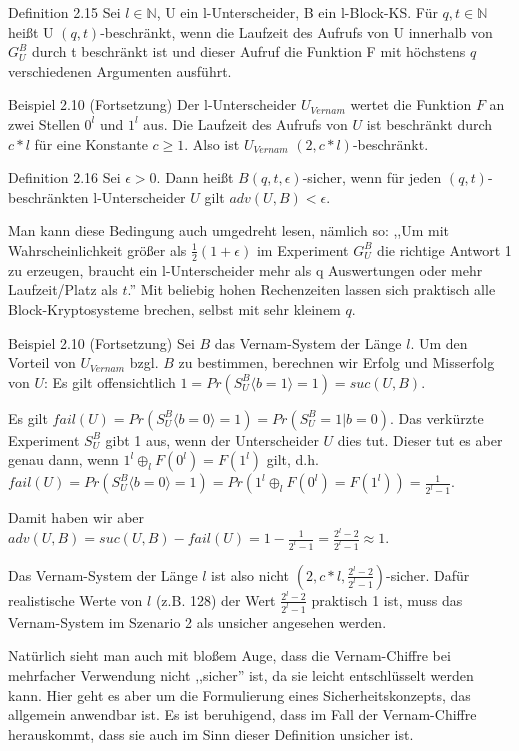 \documentclass[a4paper]{article}
\begin{document}
\begin{multicols}{3}
    Definition 2.15 Sei $l\in\mathbb{N}$, U ein l-Unterscheider, B ein l-Block-KS. Für $q,t\in\mathbb{N}$ heißt U $(q,t)$-beschränkt, wenn die Laufzeit des Aufrufs von U innerhalb von $G^B_U$ durch t beschränkt ist und dieser Aufruf die Funktion F mit höchstens $q$ verschiedenen Argumenten ausführt.

    Beispiel 2.10 (Fortsetzung) Der l-Unterscheider $U_{Vernam}$ wertet die Funktion $F$ an zwei Stellen $0^l$ und $1^l$ aus. Die Laufzeit des Aufrufs von $U$ ist beschränkt durch $c*l$ für eine Konstante $c\geq 1$. Also ist $U_{Vernam}$ $(2,c*l)$-beschränkt.

    Definition 2.16 Sei $\epsilon>0$. Dann heißt $B(q,t,\epsilon)$-sicher, wenn für jeden $(q,t)$-beschränkten l-Unterscheider $U$ gilt $adv(U,B)< \epsilon$.

    Man kann diese Bedingung auch umgedreht lesen, nämlich so: ,,Um mit Wahrscheinlichkeit größer als $\frac{1}{2}(1 +\epsilon)$ im Experiment $G^B_U$ die richtige Antwort 1 zu erzeugen, braucht ein l-Unterscheider mehr als q Auswertungen oder mehr Laufzeit/Platz als $t$.'' Mit beliebig hohen Rechenzeiten lassen sich praktisch alle Block-Kryptosysteme brechen, selbst mit sehr kleinem $q$.

    Beispiel 2.10 (Fortsetzung) Sei $B$ das Vernam-System der Länge $l$. Um den Vorteil von $U_{Vernam}$ bzgl. $B$ zu bestimmen, berechnen wir Erfolg und Misserfolg von $U$: Es gilt offensichtlich $1=Pr(S^B_U\langle b= 1\rangle = 1) = suc(U,B)$.

    Es gilt $fail(U) = Pr(S^B_U\langle b= 0\rangle = 1) = Pr(S_U^B= 1|b= 0)$. Das verkürzte Experiment $S_U^B$ gibt 1 aus, wenn der Unterscheider $U$ dies tut. Dieser tut es aber genau dann, wenn $1^l\oplus_l F(0^l) =F(1^l)$ gilt, d.h. $fail(U) = Pr(S_U^B\langle b= 0\rangle = 1) = Pr(1^l\oplus_l F(0^l) =F(1^l)) = \frac{1}{2^l- 1}$.

    Damit haben wir aber $adv(U,B) = suc(U,B)-fail(U) = 1-\frac{1}{2^l- 1}=\frac{2^l-2}{2^l-1}\approx 1$.

    Das Vernam-System der Länge $l$ ist also nicht $(2,c*l,\frac{2^l- 2}{2^l- 1})$-sicher. Dafür realistische Werte von $l$ (z.B. 128) der Wert $\frac{2^l-2}{2^l-1}$ praktisch 1 ist, muss das Vernam-System im Szenario 2 als unsicher angesehen werden.

    Natürlich sieht man auch mit bloßem Auge, dass die Vernam-Chiffre bei mehrfacher Verwendung nicht ,,sicher'' ist, da sie leicht entschlüsselt werden kann. Hier geht es aber um die Formulierung eines Sicherheitskonzepts, das allgemein anwendbar ist. Es ist beruhigend, dass im Fall der Vernam-Chiffre herauskommt, dass sie auch im Sinn dieser Definition unsicher ist.


\end{multicols}
\end{document}

